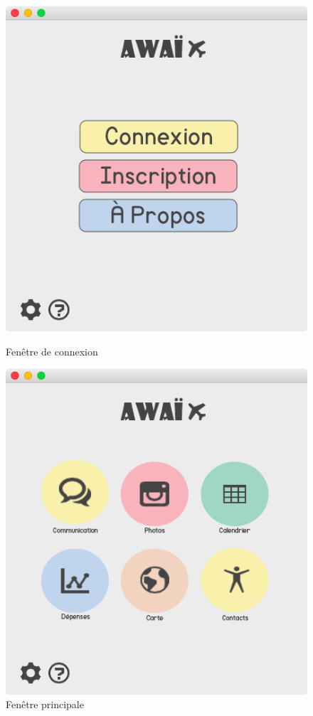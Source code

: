 \documentclass[11pt]{article}
\begin{document}
\begin{figure}[hbtp]
    \begin{minipage}[b]{0.4\linewidth}
        \centering \includegraphics[scale=0.43]{Modelisation/connexion.png}
        \caption{Fenêtre de connexion}
	\label{fig:connexion}
    \end{minipage}\hfill
    \begin{minipage}[b]{0.48\linewidth}
        \centering \includegraphics[scale=0.43]{Modelisation/awai.png}
       \caption{Fenêtre principale}
\label{fig:principale}
    \end{minipage}
\end{figure}
\end{document}
